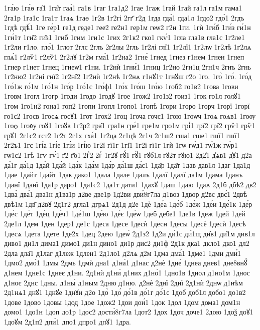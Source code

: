 {1га́ю
1га́ѳ
га̑1
1га̑т
гаа́1
га1в
1гаг
1га1д2
1гае
1гаж
1гай
1гай
га1л
га1м
гама1
2га1р
1га1с
1га1т
1гаѧ
1гаѳ
1г2в
1г2гі
2гг҃
г2д
1гда
гда́1
гда1л
1гдо2
гдо́1
2гдъ
1гдѣ
гдѣ́1
1ге
ге́р1
ге1д
геде1
гее2
ге2н1
гер1м
геѡ2
г2и
1ги.
1гѝ
1ги́б
1ги́з
ги́1н
1ги́1т
1ги̑2
ги̑з1
1гиб
1гим
1ги1с
1гих
2г1к2
гко1
гкѵ́1
1гла
гла1в
гла1с
1г2ле1
1г2ли
г1ло.
гло́1
1глот
2глс
2глъ
2г2лы
2гль
1г2лі
глї1
1г2лї1
1г2лѡ
1г2лѣ
1г2лѧ
глѧ́1
г2лѷ1
г2лѷ1
2г2лꙋ
1г2м
гма́1
1г2на2
1гне́
1гнед
1гнез
г1нем
1гнен
1гнеп
1гнер
г1нет
1гнец
1гнеѡ1
г1ни.
1г2нѝ
1гни́1
1гниц
1г2но
2гн1ц
2гн1ч
2гнъ
2гнь
1г2ню2
1г2ні
гнї2
1г2нї2
1г2нѝ
1г2нѣ
1г2нѧ
г1нꙋ1т
1гнꙋш
г2о
1го.
1го̀
1го́.
1го́д
1го́1ж
го́1м
1го́1н
1го́р
1го́1с
1го́ф1
1го́х
1го́ш
1го́ю
1гоб2
го1в2
1гова
1гови
1говм
1гогл
1гогр
1годи
1годо
1годꙋ
1гое
1гож2
1го1з2
гоиз1
1гок
го1л
голꙋ1
1гом
1го1н2
гона1
гоп2
1гопи
1гопл
1гопо1
1гопѣ
1гори
1горо
1горч
1горї
1горї
го1с2
1госв
1госѧ
госꙋ1
1гот
1гох2
1гоц
1гоча
гочє1
1гою
1гоѡч
1гоѧ
гоѧв1
1гоѹ
1гоѻ
1гоᲂу
гоꙋ1
1гоꙋв
1г2р2
гра̑1
гра1н
гре́1
гре1м
гро1м
грі́1
грї2
грї2
грѷ1
грѷ1
грꙋ1
2г1с2
гст2
1г2т
2г1х
гха́1
1г2ца
2г1цѣ
2г1ч
2г1ш2
гша1
гше1
гшї1
гшї1
2г2ъ1
1гє
1гі́а
1гі́е
1гі́и
1гі́ю
1г2ї
гї1г
1гі̑1
1г2ї
гї1г
1гѝ
1гѡ
гѡ́д1
гѡ́1ж
гѡ́р1
гѡ1с2
1гѣ
1гѵ
гѵ́1
г҃2
г҃о1
2гⷣ2
2гⷭ
1г2ꙋ
гꙋ́1
гꙋ̑1
гꙋб1л
гꙋ2т
гꙋю1
2д2̾1
д̾ѧв1
д̾ꙋ1
д2а
да́1г
да́1д
1да́й
1да́й
1да́к
1да́м
1да́р
да́1ш
да́є1
1да̑р
1да̑т
1дав
дав1л
1даг
1да1д
1дае
1дайт
1дайт
1дак
дако1
1дала
1дале
1далъ
1далї
1далї
да1м
1дама
1данъ
1данї
1данї
1да1р
даро1
1да1с2
1да1т
дати1
1дахꙋ
1даш
1даю
1даѧ
2д1б
дбѣ2
дв2
1два̀
два́1
два1н
д1ва1р
д2ве
две1р
1д2ви
дви́8г7ла
д1воз
1двор
д2вє
двє́1
2двѣ
двѣ1м
1дв҃
д2вꙋ
2д1г2
дгла1
дгрѧ1
2д1д
д2е
1дѐ
1де́а
1де́б
1де́ж
1де́и
1де́1к
1де́р
1де́с
1де́т
1де́ц
1де́ч1
1де́1ш
1де́ю
1де́є
1де́ѡ
1деб
дебе1
1де1в
1деж
1дей
1дей
2де1л
1дем
1ден
1дер1
де1с
1деса
1десе
1десѝ
1десн
1десы
1десѐ
1десѝ
1десѣ
1десѧ
1дета
1дете
1де2х
1дец
2дею
1деѡ́
2д1з2
1д2и
ди́1с
ди́1щ
ди̑в1
ди̑1м
див1л
диво1
ди1л
дима1
димо1
ди1н
дино1
ди1р
дис2
ди1ф
2д1к
дка1
дкло1
дко1
дл2
2дла
дла̑1
д1лаг
д1леж
1длен1
2д1ло1
д2лѧ
д2м
1дма
дма́1
1дме1
1дми
дми́1
1дмо2
дмо́1
1дмы
2дмь
1дмѝ
дна1
д1на́1
д1нас
д2нѐ
1дне́
1днеа
днев1
дне8внꙋ́
д1нем
1дне1с
1днеє
д1ни.
2д1нѝ
д1ни́
д1них
д1но́1
1дно1в
1днол
д1но1м
1днос
д1ноє
2днс
1дны.
д1ны́
д1ным
2дню
д1ню.
д2нѐ
2днї
2днї
2д1нѝ
2днѡ
д1нѣм
2д1нѧ1
днꙋ1
1днꙋе
1днꙋи
д2о
1до̀
1до́
до́1в
до́1г
до́1с
1доб
доб1л
добо1
до1в2
1дове
1дово
1довы
1дод
1дое
1дож2
1дои
дои́1
1док
1дол
1дом
дома1
дом1н
домо1
1до1н
1доп
до1р
1дос2
дости́8г7ла
1дот2
1дох
1доч
доче1
2дою
1доѯ
доꙋ1
1доꙋм
2д1п2
дпи́1
дпо1
дпро1
дпꙋ1
1дра.
}
